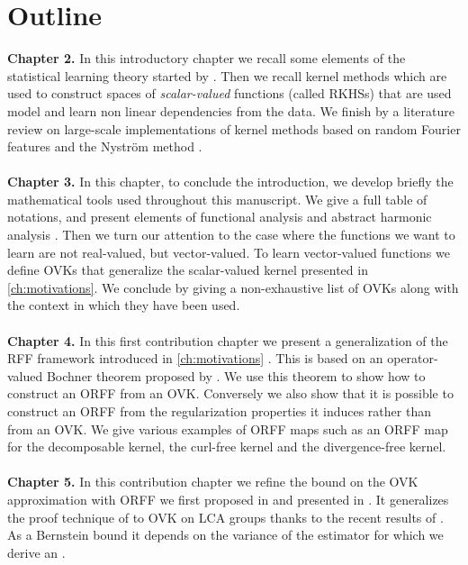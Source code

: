 \section{Outline}
\textbf{Chapter 2.}
In this introductory chapter we recall some elements of the statistical
learning theory started by \citet{Vapnik1998}. Then we recall kernel methods
\citep{Aronszajn1950} which are used to construct spaces of
\emph{scalar-valued} functions (called \acsp{RKHS}) that are used model and
learn non linear dependencies from the data. We finish by a literature review
on large-scale implementations of kernel methods based on random Fourier
features \citep{Rahimi2007} and the Nystr\"om method
\citep{Williams2000-nystrom}.
\paragraph{}
\textbf{Chapter 3.}
In this chapter, to conclude the introduction, we develop briefly the
mathematical tools used throughout this manuscript. We give a full table of
notations, and present elements of functional analysis
\citep{kurdila2006convex} and abstract harmonic analysis
\citep{folland1994course}. Then we turn our attention to the case where the
functions we want to learn are not real-valued, but vector-valued.  To learn
vector-valued functions we define \aclp{OVK} \citep{Micchelli2005, Carmeli2010}
that generalize the scalar-valued kernel presented in \cref{ch:motivations}. We
conclude by giving a non-exhaustive list of \aclp{OVK} along with the context
in which they have been used.

\paragraph{}
\textbf{Chapter 4.}
In this first contribution chapter we present a generalization of the \acs{RFF}
framework introduced in \cref{ch:motivations} \citep{brault2016random}. This is
based on an operator-valued Bochner theorem proposed by \citet{Carmeli2010}. We
use this theorem to show how to construct an \acf{ORFF} from an \acs{OVK}.
Conversely we also show that it is possible to construct an \acs{ORFF} from the
regularization properties it induces rather than from an \acs{OVK}. We give
various examples of \acs{ORFF} maps such as an \acs{ORFF} map for the
decomposable kernel, the curl-free kernel and the divergence-free kernel.

\paragraph{}
\textbf{Chapter 5.}
In this contribution chapter we refine the bound on the \ac{OVK} approximation
with \ac{ORFF} we first proposed in \cite{brault2016random} and presented in
\cite{braultborne}. It generalizes the proof technique of \citet{Rahimi2007} to
\ac{OVK} on \ac{LCA} groups thanks to the recent results of
\citet{sutherland2015, tropp2015introduction, minsker2011some,
koltchinskii2013remark}. As a Bernstein bound it depends on the variance of the
estimator for which we derive an .

